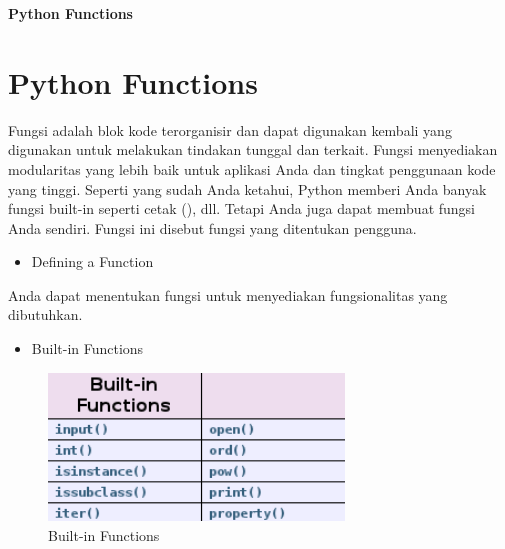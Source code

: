
\sloppy
\begin{center}{\fontsize{16pt}{16pt}\selectfont \textbf{Python Functions} \\}\end{center} \par
\vspace{12pt}
 \section{Python Functions}
\noindent 
 \hspace*{0.5in} Fungsi adalah blok kode terorganisir dan dapat digunakan kembali yang digunakan untuk melakukan tindakan tunggal dan terkait. Fungsi menyediakan modularitas yang lebih baik untuk aplikasi Anda dan tingkat penggunaan kode yang tinggi. Seperti yang sudah Anda ketahui, Python memberi Anda banyak fungsi built-in seperti cetak (), dll. Tetapi Anda juga dapat membuat fungsi Anda sendiri. Fungsi ini disebut fungsi yang ditentukan pengguna. \par
\vspace{12pt}
\noindent 
\begin{itemize}
	\item Defining a Function 
\end{itemize}
\noindent 
Anda dapat menentukan fungsi untuk menyediakan fungsionalitas yang dibutuhkan.\par
\vspace{\baselineskip}

\begin{itemize}
	\item Built-in Functions
\end{itemize}

\begin{figure}[ht]
	\centerline{\includegraphics[width=0.70\textwidth]{figures/Functions}}
	\caption{Built-in Functions}
	\label{Built-in Functions}
\end{figure}


